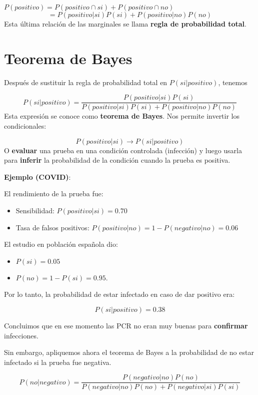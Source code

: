 \documentclass[
]{book}
\providecommand{\tightlist}{%
  \setlength{\itemsep}{0pt}\setlength{\parskip}{0pt}}
\begin{document}
\(P(positivo)=P(positivo \cap si) + P(positivo \cap no)\)
\[= P(positivo|si)P(si)+P(positivo|no)P(no)\]
Esta última relación de las marginales se llama \textbf{regla de probabilidad total}.

\hypertarget{teorema-de-bayes}{%
\section{Teorema de Bayes}\label{teorema-de-bayes}}

Después de sustituir la regla de probabilidad total en \(P(si|positivo)\), tenemos

\[P(si|positivo)=\frac{P(positivo|si)P(si)}{P(positivo|si)P(si)+P(positivo|no)P(no)}\]
Esta expresión se conoce como \textbf{teorema de Bayes}. Nos permite invertir los condicionales:

\[P(positivo|si) \rightarrow P(si|positivo)\]
O \textbf{evaluar} una prueba en una condición controlada (infección) y luego usarla para \textbf{inferir} la probabilidad de la condición cuando la prueba es positiva.

\textbf{Ejemplo (COVID)}:

El rendimiento de la prueba fue:

\begin{itemize}
\item
  Sensibilidad: \(P(positivo|si)=0.70\)
\item
  Tasa de falsos positivos: \(P(positivo|no)=1- P(negativo|no)=0.06\)
\end{itemize}

El estudio en población española dio:

\begin{itemize}
\tightlist
\item
  \(P(si)=0.05\)
\item
  \(P(no)=1-P(si)=0.95\).
\end{itemize}

Por lo tanto, la probabilidad de estar infectado en caso de dar positivo era:

\[P(si|positivo)=0.38\]

Concluimos que en ese momento las PCR no eran muy buenas para \textbf{confirmar} infecciones.

Sin embargo, apliquemos ahora el teorema de Bayes a la probabilidad de no estar infectado si la prueba fue negativa.

\[P(no|negativo) = \frac{P(negativo|no) P(no)}{P(negativo|no) P(no)+P(negativo|si)P(si)}\]
\end{document}
